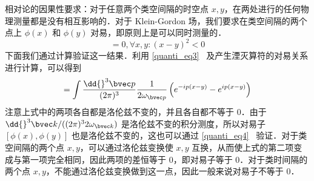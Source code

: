 
相对论的因果性要求：对于任意两个类空间隔的时空点 $x,y$，在两处进行的任何物理测量都是没有相互影响的．对于 Klein-Gordon 场，我们要求在类空间隔的两个点上 $\phi(x)$ 和 $\phi(y)$ 对易，即原则上是可以同时测量的．
\begin{equation}
[\phi(x),\phi(y)]=0,\forall x,y:(x-y)^2<0
\end{equation}
下面我们通过计算验证这一结果．利用 \autoref{quanti_eq3}~ 及产生湮灭算符的对易关系进行计算，可以得到
\begin{equation}
[\phi(x),\phi(y)]=\int \frac{\dd{}^3 \bvec p}{(2\pi)^3} \frac{1}{2\omega_{\bvec p}}
\left( e^{-ip(x-y)}-e^{ip(x-y)}\right)
\end{equation}
注意上式中的两项各自都是洛伦兹不变的，并且各自都不等于 $0$．由于 $\dd{}^3 \bvec k/((2\pi)^3 2\omega_{\bvec k})$ 是洛伦兹不变的积分测度，所以对易子 $[\phi(x),\phi(y)]$ 也是洛伦兹不变的，这也可以通过 \autoref{quanti_eq4}~ 验证．对于类空间隔的两个点 $x,y$，可以通过洛伦兹变换使 $x,y$ 互换，从而使上式的第二项变成与第一项完全相同，因此两项的差恒等于 $0$，即对易子等于 $0$．对于类时间隔的两个点 $x,y$，不能通过洛伦兹变换做到这一点，因此一般来说对易子不等于 $0$．




